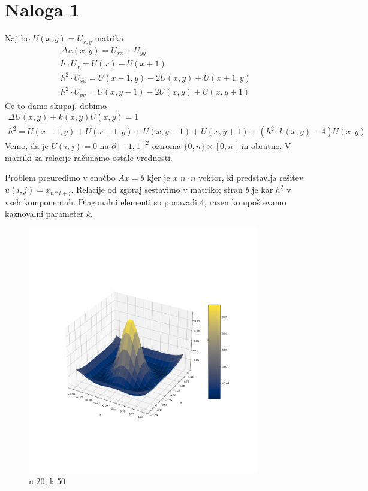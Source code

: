 \documentclass{article}
\begin{document}
\section{Naloga 1}
    Naj bo \(U(x,y) = U_{x,y}\) matrika
    \begin{align*}
        \Delta u(x,y) = U_{xx} + U_{yy}\\
        h\cdot U_x = U(x) - U(x+1)\\
        h^2\cdot U_{xx} = U(x-1, y) - 2U(x,y) + U(x+1,y)\\
        h^2\cdot U_{yy} = U(x, y-1) - 2U(x,y) + U(x, y+1)
    \end{align*}
    Če to damo skupaj, dobimo
    \begin{align*}
        \Delta U(x,y) + k(x,y)U(x,y) = 1\\
        h^2 = U(x-1,y)+U(x+1,y)+U(x,y-1)+U(x,y+1) + (h^2\cdot k(x,y)- 4) U(x,y)
    \end{align*}
    Vemo, da je \(U(i,j)=0\) na \(\partial [-1,1]^2\) oziroma \(\{0,n\}\times [0,n]\) in obratno. V matriki za relacije računamo ostale vrednosti.
    
    Problem preuredimo v enačbo \(Ax=b\) kjer je \(x\) \(n\cdot n\) vektor, ki predstavlja rešitev \(u(i,j) = x_{n*i+j}\). Relacije od zgoraj sestavimo v matriko; stran \(b\) je kar \(h^2\) v vseh komponentah. Diagonalni elementi so ponavadi \(4\), razen ko upoštevamo kaznovalni parameter \(k\).

    \begin{figure}[h]
        \centering
        \includegraphics[width=0.9\textwidth]{nal1_n20_k50.png}
        \caption{n 20, k 50}
    \end{figure}
\end{document}
